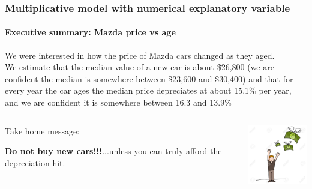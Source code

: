 \documentclass{beamer}\usepackage[]{graphicx}\usepackage[]{xcolor}
\begin{document}
\begin{frame}[fragile]
\frametitle{Multiplicative model with numerical explanatory variable}
\framesubtitle{Executive summary: Mazda  price vs age}

We were interested in how the price of Mazda cars changed as they aged.\\
\bigskip
We estimate that the median value of a new car is about \$26,800 (we are confident the median is somewhere between \$23,600 and \$30,400) and that for every year the car ages the median price depreciates at about 15.1\% per year, and we are confident it is somewhere between 16.3 and 13.9\% 
\bigskip
\begin{columns}
\begin{column}{0.7\textwidth}
Take home message: 

\textbf{Do not buy new cars!!!}...unless you can truly afford the depreciation hit.
\end{column}
\begin{column}{0.3\textwidth}
\includegraphics[width=1.25in]{LosingMoney.jpg}
\end{column}
\end{columns}

\end{frame}
\end{document}
